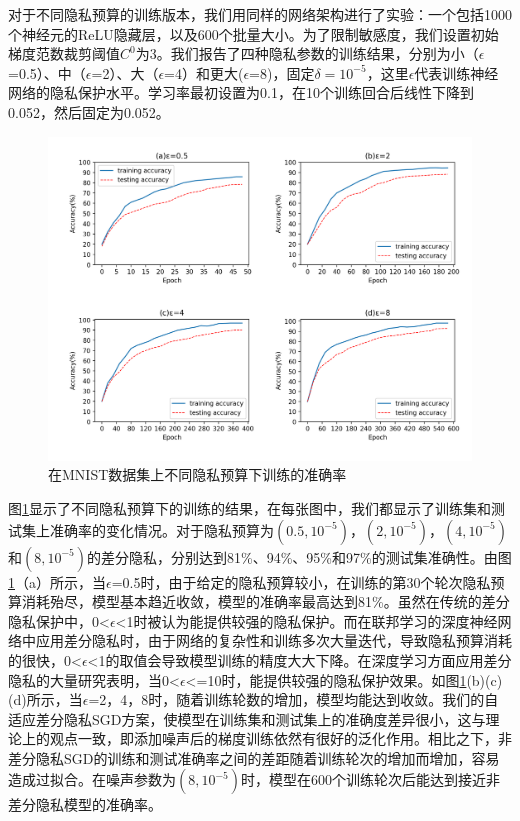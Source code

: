 对于不同隐私预算的训练版本，我们用同样的网络架构进行了实验：一个包括1000个神经元的ReLU隐藏层，以及600个批量大小。为了限制敏感度，我们设置初始梯度范数裁剪阈值$C^{0}$为3。我们报告了四种隐私参数的训练结果，分别为小（$\epsilon$=0.5）、中（$\epsilon$=2）、大（$\epsilon$=4）和更大($\epsilon$=8)，固定$\delta=10^{-5}$，这里$\epsilon$代表训练神经网络的隐私保护水平。学习率最初设置为0.1，在10个训练回合后线性下降到0.052，然后固定为0.052。

\begin{figure}[!hbt]
\centering
	\includegraphics[scale=0.6]{fig2/C3/第三章实验一2}%
	\caption{在MNIST数据集上不同隐私预算下训练的准确率}
	\label{fig:在MNIST数据集上不同隐私预算下训练的准确率}	
\end{figure}

图\ref{fig:在MNIST数据集上不同隐私预算下训练的准确率}显示了不同隐私预算下的训练的结果，在每张图中，我们都显示了训练集和测试集上准确率的变化情况。对于隐私预算为$\left(0.5,10^{-5}\right)$，$\left(2,10^{-5}\right)$，$\left(4,10^{-5}\right)$和$\left(8,10^{-5}\right)$的差分隐私，分别达到81\%、94\%、95\%和97\%的测试集准确性。由图\ref{fig:在MNIST数据集上不同隐私预算下训练的准确率}（a）所示，当$\epsilon$=0.5时，由于给定的隐私预算较小，在训练的第30个轮次隐私预算消耗殆尽，模型基本趋近收敛，模型的准确率最高达到81\%。虽然在传统的差分隐私保护中，0<$\epsilon$<1时被认为能提供较强的隐私保护。而在联邦学习的深度神经网络中应用差分隐私时，由于网络的复杂性和训练多次大量迭代，导致隐私预算消耗的很快，0<$\epsilon$<1的取值会导致模型训练的精度大大下降。在深度学习方面应用差分隐私的大量研究表明，当0<$\epsilon$<=10时，能提供较强的隐私保护效果。如图\ref{fig:在MNIST数据集上不同隐私预算下训练的准确率}(b)(c)(d)所示，当$\epsilon$=2，4，8时，随着训练轮数的增加，模型均能达到收敛。我们的自适应差分隐私SGD方案，使模型在训练集和测试集上的准确度差异很小，这与理论上的观点一致，即添加噪声后的梯度训练依然有很好的泛化作用。相比之下，非差分隐私SGD的训练和测试准确率之间的差距随着训练轮次的增加而增加，容易造成过拟合。在噪声参数为$\left(8,10^{-5}\right)$时，模型在600个训练轮次后能达到接近非差分隐私模型的准确率。

